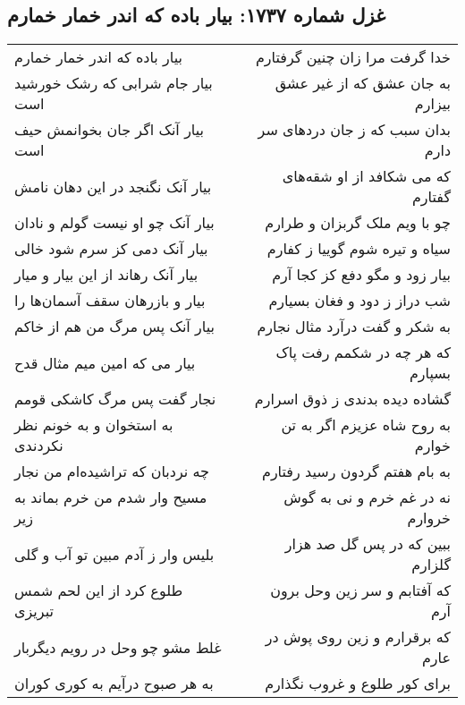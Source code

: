 \begin{center}
\section*{غزل شماره ۱۷۳۷: بیار باده که اندر خمار خمارم}
\label{sec:1737}
\begin{longtable}{l p{0.5cm} r}
بیار باده که اندر خمار خمارم
&&
خدا گرفت مرا زان چنین گرفتارم
\\
بیار جام شرابی که رشک خورشید است
&&
به جان عشق که از غیر عشق بیزارم
\\
بیار آنک اگر جان بخوانمش حیف است
&&
بدان سبب که ز جان دردهای سر دارم
\\
بیار آنک نگنجد در این دهان نامش
&&
که می شکافد از او شقه‌های گفتارم
\\
بیار آنک چو او نیست گولم و نادان
&&
چو با ویم ملک گربزان و طرارم
\\
بیار آنک دمی کز سرم شود خالی
&&
سیاه و تیره شوم گوییا ز کفارم
\\
بیار آنک رهاند از این بیار و میار
&&
بیار زود و مگو دفع کز کجا آرم
\\
بیار و بازرهان سقف آسمان‌ها را
&&
شب دراز ز دود و فغان بسیارم
\\
بیار آنک پس مرگ من هم از خاکم
&&
به شکر و گفت درآرد مثال نجارم
\\
بیار می که امین میم مثال قدح
&&
که هر چه در شکمم رفت پاک بسپارم
\\
نجار گفت پس مرگ کاشکی قومم
&&
گشاده دیده بدندی ز ذوق اسرارم
\\
به استخوان و به خونم نظر نکردندی
&&
به روح شاه عزیزم اگر به تن خوارم
\\
چه نردبان که تراشیده‌ام من نجار
&&
به بام هفتم گردون رسید رفتارم
\\
مسیح وار شدم من خرم بماند به زیر
&&
نه در غم خرم و نی به گوش خروارم
\\
بلیس وار ز آدم مبین تو آب و گلی
&&
ببین که در پس گل صد هزار گلزارم
\\
طلوع کرد از این لحم شمس تبریزی
&&
که آفتابم و سر زین وحل برون آرم
\\
غلط مشو چو وحل در رویم دیگربار
&&
که برقرارم و زین روی پوش در عارم
\\
به هر صبوح درآیم به کوری کوران
&&
برای کور طلوع و غروب نگذارم
\\
\end{longtable}
\end{center}
